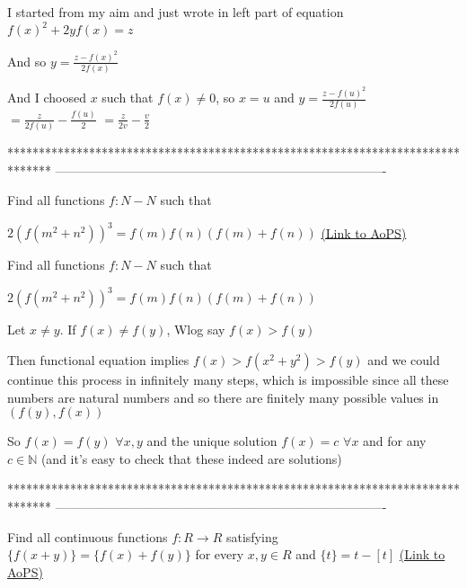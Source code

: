 \begin{solution}
	I started from my aim and just wrote in left part of equation $f(x)^2+2yf(x)=z$

And so $y=\frac{z-f(x)^2}{2f(x)}$

And I choosed $x$ such that $f(x)\ne 0$, so $x=u$ and $y=\frac {z-f(u)^2}{2f(u)}$ $=\frac z{2f(u)}-\frac{f(u)}2$ $=\frac z{2v}-\frac v2$
\end{solution}
*******************************************************************************
-------------------------------------------------------------------------------

\begin{problem}
	Find all functions $f:N-N$ such that 

$2(f(m^2+n^2))^3=f(m)f(n)(f(m)+f(n))$
	\flushright \href{https://artofproblemsolving.com/community/c6h484435}{(Link to AoPS)}
\end{problem}



\begin{solution}
	\begin{tcolorbox}Find all functions $f:N-N$ such that 

$2(f(m^2+n^2))^3=f(m)f(n)(f(m)+f(n))$\end{tcolorbox}
Let $x\ne y$. If $f(x)\ne f(y)$, Wlog say $f(x)>f(y)$

Then functional equation implies $f(x)>f(x^2+y^2)>f(y)$ and we could continue this process in infinitely many steps, which is impossible since all these numbers are natural numbers and so there are finitely many possible values in $(f(y),f(x))$

So $f(x)=f(y)$ $\forall x,y$ and the unique solution $\boxed{f(x)=c}$ $\forall x$ and for any $c\in\mathbb N$ (and it's easy to check that these indeed are solutions)
\end{solution}
*******************************************************************************
-------------------------------------------------------------------------------

\begin{problem}
	Find all continuous functions $f: R \rightarrow R $ satisfying $\{f(x+y)\}=\{f(x)+f(y)\}$ for every $x,y \in R$ and 
$\{t\}=t-[t]$
	\flushright \href{https://artofproblemsolving.com/community/c6h484446}{(Link to AoPS)}
\end{problem}



